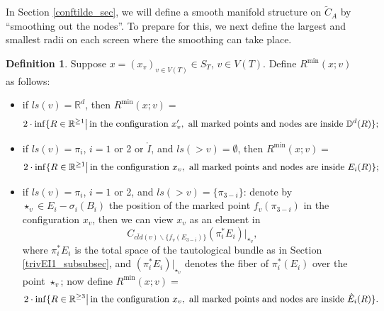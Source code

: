 \documentclass[11pt]{article}
\theoremstyle{definition}
\newtheorem{dfn}[thm]{Definition}
\theoremstyle{remark}
\def\wt#1{\widetilde{#1}}
\def\ov#1{\overline{#1}}
\def\mr#1{{\mathring{#1}}}
\def\R{\mathbb{R}}
\def\D{\mathbb{D}}
\def\tn#1{\textnormal{#1}}
\begin{document}
In Section \ref{conftilde_sec}, we will define a smooth manifold structure on $\wt{C}_A$ by ``smoothing out the nodes''. To prepare for this, we next define the largest and smallest radii on each screen where the smoothing can take place. 

\begin{dfn}\label{Rmin_dfn}
Suppose $x=(x_v)_{v\in V(T)}\in S_T$, $v\in V(T)$. 
Define $R^{\min}(x;v)$ as follows: 
\begin{itemize}
\item if $ls(v)=\R^d$, then $R^{\min}(x;v)=$
$$2\cdot\inf\{R\in\R^{\ge1}\big|\,\tn{in the configuration }x'_v,\tn{ all marked points and nodes are inside }\D^d(R)\};$$
\item if $ls(v)=\pi_i$, $i=1$ or 2 or $\mr{I}$, and $ls(>v)=\emptyset$, 
then $R^{\min}(x;v)=$
$$2\cdot\inf\{R\in\R^{\ge1}\big|\,\tn{in the configuration }x_v,\tn{ all marked points and nodes are inside }E_i(R)\};$$
\item if $ls(v)=\pi_i$, $i=1$ or 2, and $ls(>v)=\{\pi_{3-i}\}$: denote by $\star_v\in E_i-\sigma_i(B_i)$ the position of the marked point $f_v(\pi_{3-i})$ in the configuration $x_v$, then we can view $x_v$ as an element in 
$$C_{\ov{cld}(v)\backslash\{f_v(E_{3-i})\}}(\pi_i^*E_i)|_{\star_v},$$
where $\pi_i^*E_i$ is the total space of 
the tautological bundle as in Section \ref{trivEI1_subsubsec}, and $(\pi_i^*E_i)|_{\star_v}$ denotes the fiber of $\pi_i^*(E_i)$ over the point $\star_v$;
now define $R^{\min}(x;v)=$
$$2\cdot\inf\{R\in\R^{\ge3}\big|\,\tn{in the configuration }x_v,\tn{ all marked points and nodes are inside }\hat E_i(R)\}.$$
\end{itemize}
\end{dfn}
\end{document}
